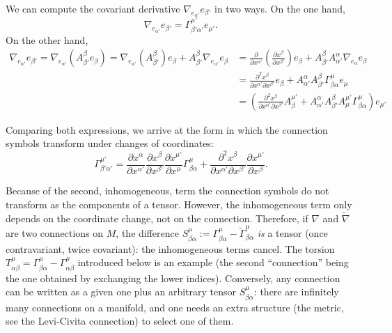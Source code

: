 \begin{points}
\item We can compute the covariant derivative $\nabla_{e_{\alpha'}}e_{\beta'}$ in two ways. On the one hand,
\[
  \nabla_{e_{\alpha'}}e_{\beta'}=\Gamma^{\mu'}_{\beta'\alpha'}e_{\mu'} .
\]
On the other hand,
\begin{align*}
  \nabla_{e_{\alpha'}}e_{\beta'}=\nabla_{e_{\alpha'}}(A^\beta_{\beta'}e_\beta)=\nabla_{e_{\alpha'}}(A^\beta_{\beta'})e_\beta+A^\beta_{\beta'}\nabla_{e_{\alpha'}}e_\beta&=\frac{\partial}{\partial x^{\alpha'}}\left(\frac{\partial x^\beta}{\partial x^{\beta'}}\right)e_\beta+A^\beta_{\beta'}A^\alpha_{\alpha'}\nabla_{e_\alpha}e_\beta\\
  &=\frac{\partial^2x^\beta}{\partial x^{\alpha'}\partial x^{\beta'}}e_\beta+A^\alpha_{\alpha'}A^\beta_{\beta'}\Gamma^\mu_{\beta\alpha}e_\mu\\&=\left(\frac{\partial^2x^\beta}{\partial x^{\alpha'}\partial x^{\beta'}}A^{\mu'}_\beta+A^\alpha_{\alpha'}A^\beta_{\beta'}A^{\mu'}_\mu\Gamma^\mu_{\beta\alpha}\right)e_{\mu'}
\end{align*}

\item Comparing both expressions, we arrive at the form in which the connection symbols transform under changes of coordinates:
\[
  \Gamma^{\mu'}_{\beta'\alpha'}=\frac{\partial x^\alpha}{\partial x^{\alpha'}}\frac{\partial x^\beta}{\partial x^{\beta'}}\frac{\partial x^{\mu'}}{\partial x^\mu}\Gamma^\mu_{\beta\alpha}+\frac{\partial^2x^\beta}{\partial x^{\alpha'}\partial x^{\beta'}}\frac{\partial x^{\mu'}}{\partial x^\beta} .
\]

\begin{carroll}
Because of the second, inhomogeneous, term the connection symbols do not transform as the components of a tensor. However, the inhomogeneous term only depends on the coordinate change, not on the connection. Therefore, if $\nabla$ and $\tilde\nabla$ are two connections on $M$, the difference $S^\mu_{\beta\alpha}:=\Gamma^\mu_{\beta\alpha}-\tilde\Gamma^\mu_{\beta\alpha}$ \emph{is} a tensor (once contravariant, twice covariant): the inhomogeneous terms cancel. The torsion $T^\mu_{\alpha\beta}=\Gamma^\mu_{\beta\alpha}-\Gamma^\mu_{\alpha\beta}$ introduced below is an example (the second ``connection'' being the one obtained by exchanging the lower indices). Conversely, any connection can be written as a given one plus an arbitrary tensor $S^\mu_{\beta\alpha}$: there are infinitely many connections on a manifold, and one needs an extra structure (the metric, see the Levi-Civita connection) to select one of them.


\end{carroll}
\end{points}
